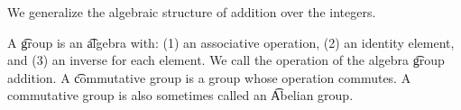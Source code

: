 

We generalize the algebraic structure of addition over the integers.


A \t{group} is an \t{algebra} with:
(1) an associative operation,
(2) an identity element, and
(3) an inverse for each element.
We call the operation of the algebra \t{group addition}.
A \t{commutative group} is a group whose operation commutes.
A commutative group is also sometimes called an \t{Abelian group}.

\blankpage
